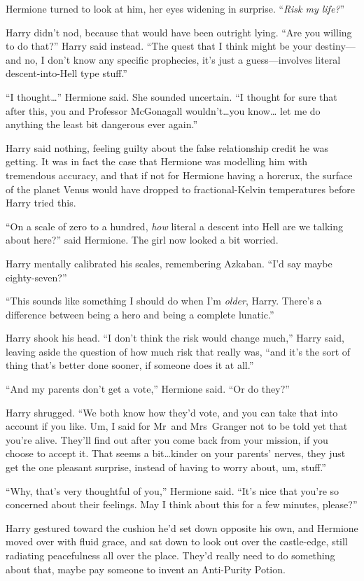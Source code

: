 Hermione turned to look at him, her eyes widening in surprise. “\emph{Risk my life?}”

Harry didn’t nod, because that would have been outright lying. “Are you willing to do that?” Harry said instead. “The quest that I think might be your destiny—and no, I don’t know any specific prophecies, it’s just a guess—involves literal descent-into-Hell type stuff.”

“I thought…” Hermione said. She sounded uncertain. “I thought for sure that after this, you and Professor McGonagall wouldn’t…you know… let me do anything the least bit dangerous ever again.”

Harry said nothing, feeling guilty about the false relationship credit he was getting. It was in fact the case that Hermione was modelling him with tremendous accuracy, and that if not for Hermione having a horcrux, the surface of the planet Venus would have dropped to fractional-Kelvin temperatures before Harry tried this.

“On a scale of zero to a hundred, \emph{how} literal a descent into Hell are we talking about here?” said Hermione. The girl now looked a bit worried.

Harry mentally calibrated his scales, remembering Azkaban. “I’d say maybe eighty-seven?”

“This sounds like something I should do when I’m \emph{older}, Harry. There’s a difference between being a hero and being a complete lunatic.”

Harry shook his head. “I don’t think the risk would change much,” Harry said, leaving aside the question of how much risk that really was, “and it’s the sort of thing that’s better done sooner, if someone does it at all.”

“And my parents don’t get a vote,” Hermione said. “Or do they?”

Harry shrugged. “We both know how they’d vote, and you can take that into account if you like. Um, I said for Mr~and Mrs~Granger not to be told yet that you’re alive. They’ll find out after you come back from your mission, if you choose to accept it. That seems a bit…kinder on your parents’ nerves, they just get the one pleasant surprise, instead of having to worry about, um, stuff.”

“Why, that’s very thoughtful of you,” Hermione said. “It’s nice that you’re so concerned about their feelings. May I think about this for a few minutes, please?”

Harry gestured toward the cushion he’d set down opposite his own, and Hermione moved over with fluid grace, and sat down to look out over the castle-edge, still radiating peacefulness all over the place. They’d really need to do something about that, maybe pay someone to invent an Anti-Purity Potion.

